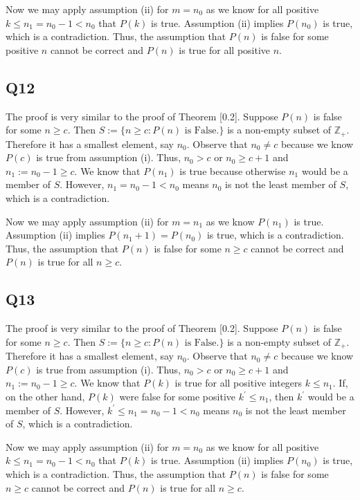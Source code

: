 \documentclass[12pt]{article}
\def\Z{{\mathbb Z}}        %
\numberwithin{theorem}{section}
\numberwithin{equation}{section}
\numberwithin{remark}{section}
\numberwithin{definition}{section}
\numberwithin{theorem}{section}
\numberwithin{lemma}{section}
\numberwithin{example}{section}
\begin{document}
Now we may apply assumption (ii) for $m=n_0$ as we know for all positive $k \le n_1 = n_0 - 1 < n_0$ that $P(k)$ is true. Assumption (ii) implies $P(n_0)$ is true, which is a contradiction. Thus, the assumption that $P(n)$ is false for some positive $n$ cannot be correct and $P(n)$ is true for all positive $n$. 



\subsection{Q12}

The proof is very similar to the proof of Theorem [0.2]. Suppose $P(n)$ is false for some $n\ge c$. Then $S:=\{n\ge c:P(n)\text{ is False.}\}$ is a non-empty subset of $\Z_+$. Therefore it has a smallest element, say $n_0$. Observe that $n_0\neq c$ because we know $P(c)$ is true from assumption (i). Thus, $n_0 > c$ or $n_0\ge c+1$ and $n_1:=n_0-1\ge c$. We know that $P(n_1)$ is true because otherwise $n_1$ would be a member of $S$. However, $n_1 = n_0 - 1 < n_0$ means $n_0$ is not the least member of $S$, which is a contradiction. 

Now we may apply assumption (ii) for $m=n_1$ as we know $P(n_1)$ is true. Assumption (ii) implies $P(n_1+1)=P(n_0)$ is true, which is a contradiction. Thus, the assumption that $P(n)$ is false for some $n\ge c$ cannot be correct and $P(n)$ is true for all $n\ge c$. 



\subsection{Q13}

The proof is very similar to the proof of Theorem [0.2]. Suppose $P(n)$ is false for some $n\ge c$. Then $S:=\{n\ge c:P(n)\text{ is False.}\}$ is a non-empty subset of $\Z_+$. Therefore it has a smallest element, say $n_0$. Observe that $n_0\neq c$ because we know $P(c)$ is true from assumption (i). Thus, $n_0 > c$ or $n_0\ge c+1$ and $n_1:=n_0-1\ge c$. We know that $P(k)$ is true for all positive integers $k\le n_1$. If, on the other hand, $P(k)$ were false for some positive $k^\prime\le n_1$, then $k^\prime$ would be a member of $S$. However, $k^\prime\le n_1 = n_0 - 1 < n_0$ means $n_0$ is not the least member of $S$, which is a contradiction. 

Now we may apply assumption (ii) for $m=n_0$ as we know for all positive $k \le n_1 = n_0 - 1 < n_0$ that $P(k)$ is true. Assumption (ii) implies $P(n_0)$ is true, which is a contradiction. Thus, the assumption that $P(n)$ is false for some $n\ge c$ cannot be correct and $P(n)$ is true for all $n\ge c$. 
\end{document}
